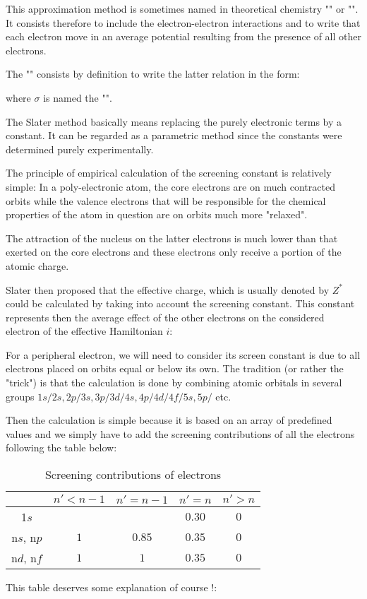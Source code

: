	This approximation method is sometimes named in theoretical chemistry "" or "". It consists therefore to include the electron-electron interactions and to write that each electron move in an average potential resulting from the presence of all other electrons.
	
	The "" consists by definition to write the latter relation in the form:
	
	where $\sigma$ is named the "".
	
	The Slater method basically means replacing the purely electronic terms by a constant. It can be regarded as a parametric method since the constants were determined purely experimentally.
	
	The principle of empirical calculation of the screening constant is relatively simple: In a poly-electronic atom, the core electrons are on much contracted orbits  while the valence electrons that will be responsible for the chemical properties of the atom in question are on orbits much more "relaxed".
	
	The attraction of the nucleus on the latter electrons is much lower than that exerted on the core electrons and these electrons only receive a portion of the atomic charge.
	
	Slater then proposed that the effective charge, which is usually denoted by $Z^*$ could be calculated by taking into account the screening constant. This constant represents then the average effect of the other electrons on the considered electron  of the effective Hamiltonian $i$:
	
	For a peripheral electron, we will need to consider its screen constant is due to all electrons placed on orbits equal or below its own. The tradition (or rather the "trick") is that the calculation is done by combining atomic orbitals in several groups $1s/2s, 2p/3s, 3p/3d/4s, 4p/4d/4f/5s, 5p/$ etc.
	
	Then the calculation is simple because it is based on an array of predefined values and we simply have to add the screening contributions of all the electrons following the table below:
	\begin{table}[h!]\centering
		\begin{tabular}{ccccc}\hline
		& $n'<n-1$ & $n'=n-1$ & $n'=n$ & $n'>n$ \\\hline
		1$s$ & & & $0.30$ & $0$ \\
		n$s$, n$p$ & $1$ & $0.85$ & $0.35$ & $0$ \\
		n$d$, n$f$ & $1$ & $1$ & $0.35$ & $0$\\ \hline
		\end{tabular}
		\caption{Screening contributions of electrons}
	\end{table}
	This table deserves some explanation of course !:
	

